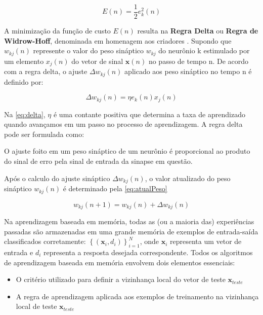 \begin{equation} \label{eq:custo}
    E(n) = \frac{1}{2}e_{k}^{2}(n)
\end{equation}

A minimização da função de custo $E(n)$ resulta na \textbf{Regra Delta} ou \textbf{Regra de Widrow-Hoff}, denominada em homenagem aos criadores \cite{widrow1960adaptive}. Supondo que $w_{kj}(n)$ represente o valor do peso sináptico $w_{kj}$ do neurônio k estimulado por um elemento $x_{j}(n)$ do vetor de sinal $\textbf{x}(n)$ no passo de tempo n. De acordo com a regra delta, o ajuste $\Delta w_{kj}(n)$ aplicado aos peso sináptico no tempo n é definido por:

\begin{equation} \label{eq:delta}
    \Delta w_{kj}(n) = \eta e_{k}(n)x_{j}(n)
\end{equation}

Na \autoref{eq:delta}, $\eta$ é uma contante positiva que determina a taxa de aprendizado quando avançamos em um passo no processo de aprendizagem. A regra delta pode ser formulada como: 
    
    \begin{citacao}
        O ajuste foito em um peso sináptico de um neurônio é proporcional ao produto do sinal de erro pela sinal de entrada da sinapse em questão. \cite{haykin2001redes}
    \end{citacao}

Após o calculo do ajuste sináptico $\Delta w_{kj}(n)$, o valor atualizado do peso sináptico $w_{kj}(n)$ é determinado pela  \autoref{eq:atualPeso}

\begin{equation} \label{eq:atualPeso}
    w_{kj}(n+1) = w_{kj}(n) + \Delta w_{kj}(n)
\end{equation}

Na aprendizagem baseada em memória, todas as (ou a maioria das) experiências passadas são armazenadas em uma grande memória de exemplos de entrada-saída classificados corretamente: $\left \{ \left ( \textbf{x}_{i}, d_{i} \right ) \right \}_{i=1}^{N}$, onde $\textbf{x}_{i}$ representa um vetor de entrada e $d_{i}$ representa a resposta desejada correspondente. Todos os algoritmos de aprendizagem baseada em memória envolvem dois elementos essenciais:
    
    \begin{itemize}
        \item O critério utilizado para definir a vizinhança local do vetor de teste $\textbf{x}_{teste}$
        \item A regra de aprendizagem aplicada aos exemplos de treinamento na vizinhança local de teste $\textbf{x}_{teste}$
    \end{itemize}

